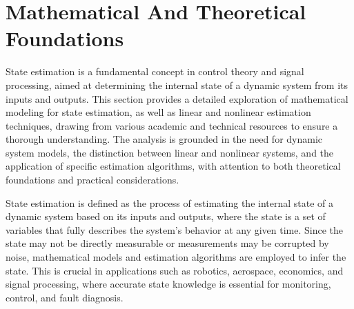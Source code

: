 \section{Mathematical And Theoretical Foundations}
State estimation is a fundamental concept in control theory and signal processing, aimed at determining the internal state of a dynamic system from its inputs and outputs. This section provides a detailed exploration of mathematical modeling for state estimation, as well as linear and nonlinear estimation techniques, drawing from various academic and technical resources to ensure a thorough understanding. The analysis is grounded in the need for dynamic system models, the distinction between linear and nonlinear systems, and the application of specific estimation algorithms, with attention to both theoretical foundations and practical considerations.

State estimation is defined as the process of estimating the internal state of a dynamic system based on its inputs and outputs, where the state is a set of variables that fully describes the system's behavior at any given time. Since the state may not be directly measurable or measurements may be corrupted by noise, mathematical models and estimation algorithms are employed to infer the state. This is crucial in applications such as robotics, aerospace, economics, and signal processing, where accurate state knowledge is essential for monitoring, control, and fault diagnosis.

